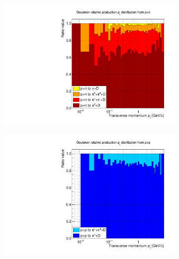 \begin{figure}[htbp]
    \centering
    \begin{subfigure}{.49\textwidth}
    \centering
        \includegraphics[width=\textwidth]{image/3-risultati/deuteron_analyse/A/p_n_stack.pdf}
        \caption{}
        \label{fig:A_pn_stack_deut}
    \end{subfigure}
    \begin{subfigure}{.49\textwidth}
        \centering
        \includegraphics[width=\textwidth]{image/3-risultati/deuteron_analyse/A/p_p_stack.pdf}
        \caption{}
        \label{fig:A_pp_stack_deut}
    \end{subfigure}
    \begin{subfigure}{.49\textwidth}
    \centering

\end{subfigure}
\end{figure}
